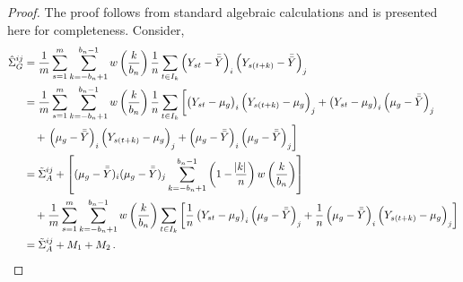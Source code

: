 \documentclass[11pt]{article}
\theoremstyle{remark}
\begin{document}
\begin{proof}
The proof follows from standard algebraic calculations and is presented here for completeness. Consider,
\begin{align*}
\hat{\Sigma}_{G}^{ij} &= \dfrac{1}{m}\sum_{s=1}^{m} \sum_{k=-b_n+1}^{b_n-1}w\left(\dfrac{k}{b_n}\right)\dfrac{1}{n}\sum_{t \in I_k} \left(Y_{st}-\bar{\bar{Y}} \right)_i \left(Y_{s(t+k)}-\bar{\bar{Y}} \right)_j\\
&= \dfrac{1}{m}\sum_{s=1}^{m}\sum_{k=-b_n+1}^{b_n-1}w\left(\dfrac{k}{b_n}\right)\dfrac{1}{n}\sum_{t \in I_k}  \left[ \left(Y_{st}-\mu_g \right)_i  \left(Y_{s(t+k)}-\mu_g \right)_j+  \left(Y_{st} - \mu_g \right)_i    \left(\mu_g - \bar{\bar{Y}} \right)_j \right. \\  
& \quad + \left. \left(\mu_g-\bar{\bar{Y}} \right)_i  \left(Y_{s(t+k)}-\mu_g \right)_j + \left(\mu_g-\bar{\bar{Y}} \right)_i  \left(\mu_g-\bar{\bar{Y}}  \right)_j  \right]\\
& = \tilde{\Sigma}^{ij}_A + \left[(\mu_g-\bar{\bar{Y}})_i(\mu_g-\bar{\bar{Y}})_j\sum_{k=-b_n+1}^{b_n-1}\left(1-\dfrac{\abs{k}}{n}\right)w\left(\dfrac{k}{b_n}\right)\right] \\ 
& \quad  + \dfrac{1}{m}\sum_{s=1}^{m}\sum_{k=-b_n+1}^{b_n-1}  w\left(\dfrac{k}{b_n}\right)\sum_{t \in I_k}  \left[\dfrac{1}{n} \left(Y_{st} - \mu_g \right)_i \left(\mu_g - \bar{\bar{Y}} \right)_j + \dfrac{1}{n} \left(\mu_g-\bar{\bar{Y}} \right)_i  \left(Y_{s(t+k)}-\mu_g \right)_j \right] \\ 
& = \tilde{\Sigma}^{ij}_A + M_1 + M_2\,.
\end{align*}


\end{proof}
\end{document}
